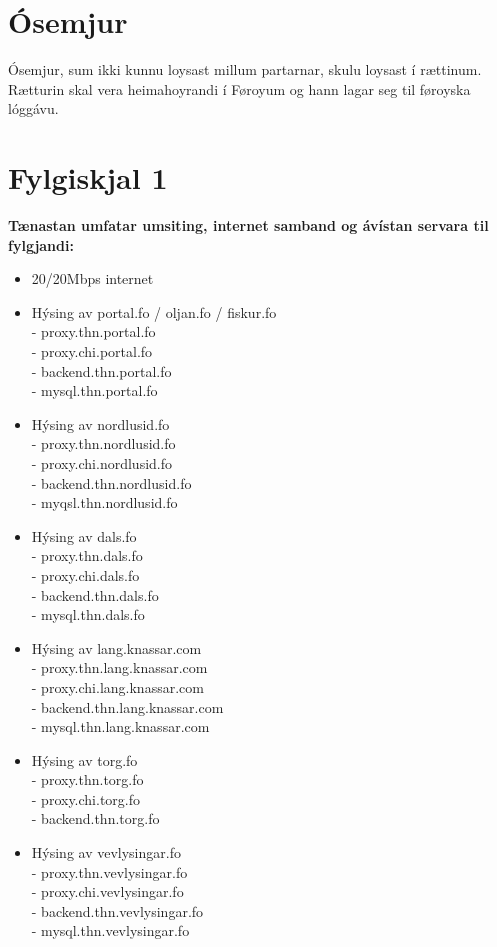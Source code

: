 \section*{Ósemjur}
Ósemjur, sum ikki kunnu loysast millum partarnar, skulu loysast í rættinum. Rætturin skal vera
heimahoyrandi í Føroyum og hann lagar seg til føroyska lóggávu.

\newpage
\section*{Fylgiskjal 1}
\textbf{Tænastan umfatar umsiting, internet samband og ávístan servara til fylgjandi:}
\begin{itemize}
	\item 20/20Mbps internet
	\item Hýsing av portal.fo / oljan.fo / fiskur.fo	\\
	 - proxy.thn.portal.fo			\\
	 - proxy.chi.portal.fo			\\
	 - backend.thn.portal.fo		\\
	 - mysql.thn.portal.fo			\\
	\item Hýsing av nordlusid.fo	\\
	 - proxy.thn.nordlusid.fo		\\
	 - proxy.chi.nordlusid.fo		\\
	 - backend.thn.nordlusid.fo		\\
	 - myqsl.thn.nordlusid.fo		\\
	\item Hýsing av dals.fo			\\
	 - proxy.thn.dals.fo			\\
	 - proxy.chi.dals.fo			\\
	 - backend.thn.dals.fo			\\
	 - mysql.thn.dals.fo			\\
	\item Hýsing av lang.knassar.com	\\
	- proxy.thn.lang.knassar.com		\\
	- proxy.chi.lang.knassar.com		\\
	- backend.thn.lang.knassar.com		\\
	- mysql.thn.lang.knassar.com		\\ 
	\item Hýsing av torg.fo			\\
	- proxy.thn.torg.fo				\\
	- proxy.chi.torg.fo				\\
	- backend.thn.torg.fo			\\
	\item Hýsing av vevlysingar.fo	\\
	- proxy.thn.vevlysingar.fo		\\
	- proxy.chi.vevlysingar.fo		\\
	- backend.thn.vevlysingar.fo	\\
	- mysql.thn.vevlysingar.fo		\\
\end{itemize}

